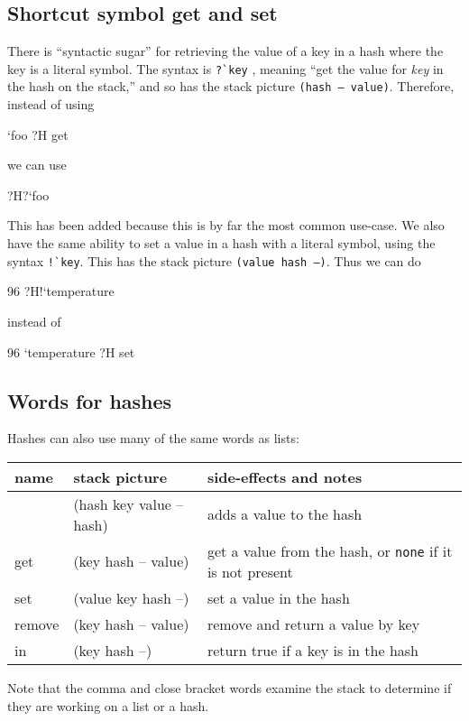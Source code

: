 \subsection{Shortcut symbol get and set}
There is ``syntactic sugar'' for retrieving the value of a key in
a hash where the key is a literal symbol. 
The syntax is \verb+?`key+ , meaning
``get the value for \emph{key} in the hash on the stack,'' and so has the stack picture \texttt{(hash -- value)}.
Therefore, instead of using
\begin{v}
`foo ?H get
\end{v}
we can use
\begin{v}
?H?`foo
\end{v}
This has been added because this is by far the most common use-case.
We also have the same ability to set a value in a hash with a literal
symbol, using the syntax \verb+!`key+. This has the stack picture \texttt{(value hash --)}.
Thus we can do
\begin{v}
96 ?H!`temperature
\end{v}
instead of
\begin{v}
96 `temperature ?H set
\end{v}
\subsection{Words for hashes}
Hashes can also use many of the same words as lists:
\indw{[\%}\indw{,}
\begin{center}
\begin{tabular}{|l|l|p{4in}|}\hline
\textbf{name} & \textbf{stack picture} & \textbf{side-effects and notes}\\ \hline
[\%    & (-- hash)    & creates a new hash\\
,    & (hash key value -- hash) & adds a value to the hash\\
]    & (hash key value -- hash) & adds a value to the hash\\
get & (key hash -- value) & get a value from the hash, or \texttt{none} if it is not present\\
set & (value key hash --) & set a value in the hash\\
remove & (key hash -- value) & remove and return a value by key\\
in & (key hash --) & return true if a key is in the hash\\
\hline
\end{tabular}
\end{center}
Note that the comma and close bracket words examine the stack to
determine if they are working on a list or a hash.


